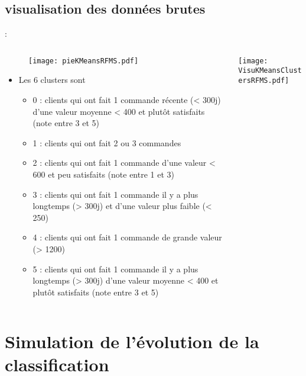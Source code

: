 \documentclass[8pt,aspectratio=169,hyperref={unicode=true}]{beamer}
\begin{document}
\subsection{visualisation des données brutes}
\begin{frame}{\insertsection: \insertsubsection}
    \begin{columns}
        \begin{column}{.5\textwidth}
            \begin{figure}
                \texttt{[image: pieKMeansRFMS.pdf]}
            \end{figure}
            \begin{itemize}
                \scriptsize
                \item Les 6 clusters sont
                      \begin{itemize}
                          \footnotesize
                          \item 0 : clients qui ont fait 1 commande récente (< 300j) d'une valeur moyenne < 400 et plutôt satisfaits (note entre 3 et 5)
                          \item 1 : clients qui ont fait 2 ou 3 commandes
                          \item 2 : clients qui ont fait 1 commande d'une valeur < 600 et peu satisfaits (note entre 1 et 3)
                          \item 3 : clients qui ont fait 1 commande il y a plus longtemps (> 300j) et d'une valeur plus faible (< 250)
                          \item 4 : clients qui ont fait 1 commande de grande valeur (> 1200)
                          \item 5 : clients qui ont fait 1 commande il y a plus longtemps (> 300j) d'une valeur moyenne < 400 et plutôt satisfaits (note entre 3 et 5)
                      \end{itemize}
            \end{itemize}
        \end{column}
        \begin{column}{.5\textwidth}
            \texttt{[image: VisuKMeansClustersRFMS.pdf]}
        \end{column}
    \end{columns}
\end{frame}

\section{Simulation de l'évolution de la classification}
\end{document}
